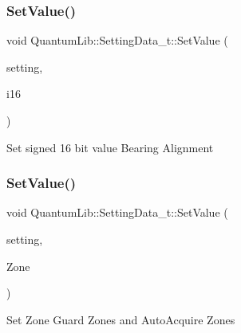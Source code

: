 \subsubsection{\texorpdfstring{Set\+Value()}{SetValue()}\hspace{0.1cm}{\footnotesize\ttfamily [5/26]}}
{\footnotesize\ttfamily void Quantum\+Lib\+::\+Setting\+Data\+\_\+t\+::\+Set\+Value (\begin{DoxyParamCaption}\item[{\mbox{\hyperlink{namespace_quantum_lib_acc8124e3e65bca4aa798d03a55e3d54c}{e\+Settings\+\_\+t}}}]{setting,  }\item[{int16\+\_\+t}]{i16 }\end{DoxyParamCaption})\hspace{0.3cm}{\ttfamily [inline]}}

Set signed 16 bit value Bearing Alignment \mbox{\label{struct_quantum_lib_1_1_setting_data__t_aff47f27bbe9d26df6824c7833d215146}} 
\subsubsection{\texorpdfstring{Set\+Value()}{SetValue()}\hspace{0.1cm}{\footnotesize\ttfamily [6/26]}}
{\footnotesize\ttfamily void Quantum\+Lib\+::\+Setting\+Data\+\_\+t\+::\+Set\+Value (\begin{DoxyParamCaption}\item[{\mbox{\hyperlink{namespace_quantum_lib_acc8124e3e65bca4aa798d03a55e3d54c}{e\+Settings\+\_\+t}}}]{setting,  }\item[{\mbox{\hyperlink{struct_quantum_lib_1_1_zone__t}{Zone\+\_\+t}} \&}]{Zone }\end{DoxyParamCaption})\hspace{0.3cm}{\ttfamily [inline]}}

Set Zone Guard Zones and Auto\+Acquire Zones \mbox{\label{struct_quantum_lib_1_1_setting_data__t_a34738db08f04aa469441eb61f9705f6d}} 
